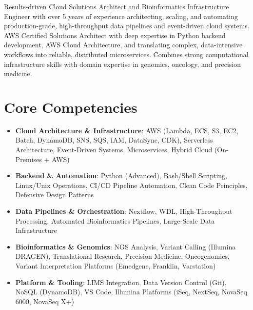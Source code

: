 \documentclass[11pt,a4paper,sans]{moderncv}
\begin{document}
\makecvtitle


\vspace{6pt}
\small{Results-driven Cloud Solutions Architect and Bioinformatics Infrastructure Engineer with over 5 years of experience architecting, scaling, and automating production-grade, high-throughput data pipelines and event-driven cloud systems. AWS Certified Solutions Architect with deep expertise in Python backend development, AWS Cloud Architecture, and translating complex, data-intensive workflows into reliable, distributed microservices. Combines strong computational infrastructure skills with domain expertise in genomics, oncology, and precision medicine.}


\section{Core Competencies}
\vspace{1pt}
\begin{itemize}

\item \textbf{Cloud Architecture \& Infrastructure}: AWS (Lambda, ECS, S3, EC2, Batch, DynamoDB, SNS, SQS, IAM, DataSync, CDK), Serverless Architecture, Event-Driven Systems, Microservices, Hybrid Cloud (On-Premises + AWS)

\item \textbf{Backend \& Automation}: Python (Advanced), Bash/Shell Scripting, Linux/Unix Operations, CI/CD Pipeline Automation, Clean Code Principles, Defensive Design Patterns

\item \textbf{Data Pipelines \& Orchestration}: Nextflow, WDL, High-Throughput Processing, Automated Bioinformatics Pipelines, Large-Scale Data Infrastructure

\item \textbf{Bioinformatics \& Genomics}: NGS Analysis, Variant Calling (Illumina DRAGEN), Translational Research, Precision Medicine, Oncogenomics, Variant Interpretation Platforms (Emedgene, Franklin, Varstation)

\item \textbf{Platform \& Tooling}: LIMS Integration, Data Version Control (Git), NoSQL (DynamoDB), VS Code, Illumina Platforms (iSeq, NextSeq, NovaSeq 6000, NovaSeq X+)

\end{itemize}
\end{document}
